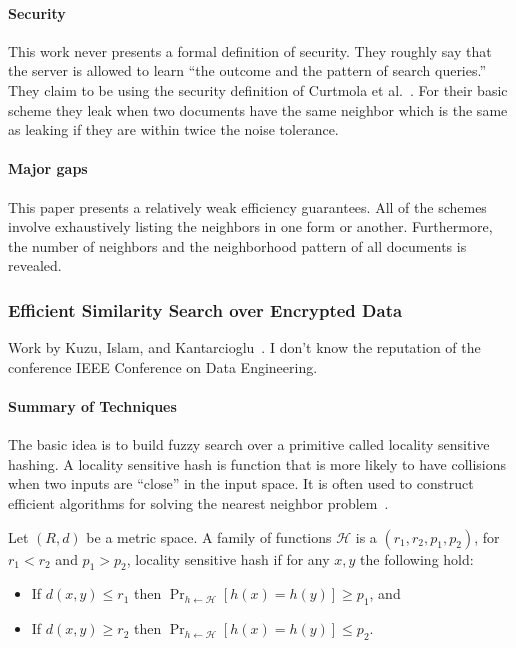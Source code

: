 \paragraph{Security}
This work never presents a formal definition of security.  They roughly say that the server is allowed to learn ``the outcome and the pattern of search queries.''  They claim to be using the security definition of Curtmola et al.~\cite{curtmola2011searchable}.  For their basic scheme they leak when two documents have the same neighbor which is the same as leaking if they are within twice the noise tolerance.  

\paragraph{Major gaps}
This paper presents a relatively weak efficiency guarantees.  All of the schemes involve exhaustively listing the neighbors in one form or another.  Furthermore, the number of neighbors and the neighborhood pattern of all documents is revealed.

\subsubsection{Efficient Similarity Search over Encrypted Data}
Work by Kuzu, Islam, and Kantarcioglu~\cite{kuzu2012efficient}.  I don't know the reputation of the conference IEEE Conference on Data Engineering.  

\paragraph{Summary of Techniques} The basic idea is to build fuzzy search over a primitive called locality sensitive hashing.  A locality sensitive hash is function that is more likely to have collisions when two inputs are ``close'' in the input space.  It is often used to construct efficient algorithms for solving the nearest neighbor problem~\cite{datar2004locality,slaney2008locality}.  

\begin{definition}
Let $(R,d)$ be a metric space.  A family of functions $\mathcal{H}$ is a $(r_1, r_2, p_1, p_2)$, for $r_1< r_2$ and $p_1 >p_2$, locality sensitive hash if for any $x, y$ the following hold:
\begin{itemize}
\item If $d(x, y) \le r_1$ then $\Pr_{h\leftarrow \mathcal{H}}[h(x) = h(y)] \ge p_1$, and 
\item If $d(x, y) \ge r_2$ then $\Pr_{h\leftarrow \mathcal{H}}[h(x) = h(y)] \le p_2$.
\end{itemize}
\end{definition}

